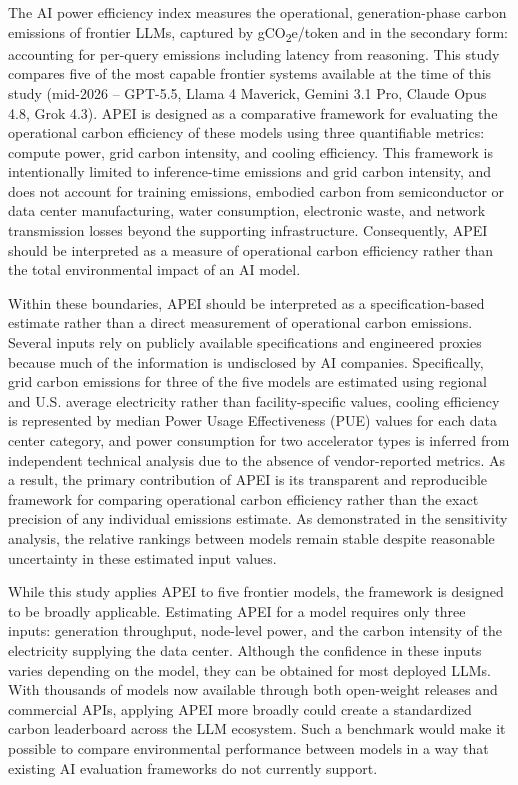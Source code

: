 \documentclass[11pt]{article}
\newcommand{\cotwo}{CO\textsubscript{2}}     %
\begin{document}
The AI power efficiency index measures the operational, generation-phase carbon emissions of frontier LLMs, captured by g\cotwo e/token and in the secondary form: accounting for per-query emissions including latency from reasoning. This study compares five of the most capable frontier systems available at the time of this study (mid-2026 -- GPT-5.5, Llama 4 Maverick, Gemini 3.1 Pro, Claude Opus 4.8, Grok 4.3). APEI is designed as a comparative framework for evaluating the operational carbon efficiency of these models using three quantifiable metrics: compute power, grid carbon intensity, and cooling efficiency. This framework is intentionally limited to inference-time emissions and grid carbon intensity, and does not account for training emissions, embodied carbon from semiconductor or data center manufacturing, water consumption, electronic waste, and network transmission losses beyond the supporting infrastructure. Consequently, APEI should be interpreted as a measure of operational carbon efficiency rather than the total environmental impact of an AI model.

Within these boundaries, APEI should be interpreted as a specification-based estimate rather than a direct measurement of operational carbon emissions. Several inputs rely on publicly available specifications and engineered proxies because much of the information is undisclosed by AI companies. Specifically, grid carbon emissions for three of the five models are estimated using regional and U.S. average electricity rather than facility-specific values, cooling efficiency is represented by median Power Usage Effectiveness (PUE) values for each data center category, and power consumption for two accelerator types is inferred from independent technical analysis due to the absence of vendor-reported metrics. As a result, the primary contribution of APEI is its transparent and reproducible framework for comparing operational carbon efficiency rather than the exact precision of any individual emissions estimate. As demonstrated in the sensitivity analysis, the relative rankings between models remain stable despite reasonable uncertainty in these estimated input values.

While this study applies APEI to five frontier models, the framework is designed to be broadly applicable. Estimating APEI for a model requires only three inputs: generation throughput, node-level power, and the carbon intensity of the electricity supplying the data center. Although the confidence in these inputs varies depending on the model, they can be obtained for most deployed LLMs. With thousands of models now available through both open-weight releases and commercial APIs, applying APEI more broadly could create a standardized carbon leaderboard across the LLM ecosystem. Such a benchmark would make it possible to compare environmental performance between models in a way that existing AI evaluation frameworks do not currently support.
\end{document}
